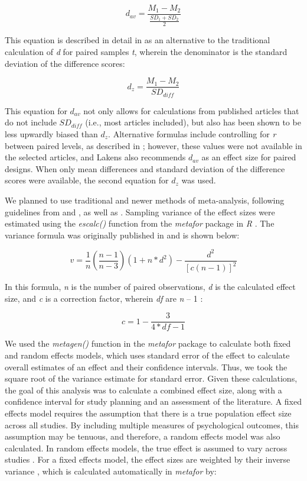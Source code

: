 \documentclass[english,man]{apa6}
\theoremstyle{definition}
\theoremstyle{definition}
\theoremstyle{definition}
\theoremstyle{remark}
\begin{document}
\[
{d_{av}} = \frac { M_1 - M_2 } { \frac { SD_1 + SD_2 } { 2 }}
\]

This equation is described in detail in \textcite{Cumming2012} as an
alternative to the traditional calculation of \emph{d} for paired
samples \emph{t}, wherein the denominator is the standard deviation of
the difference scores:

\[
{d_{z}} = \frac { M_1 - M_2 } { SD_{diff} }
\]

This equation for \(d_{av}\) not only allows for calculations from
published articles that do not include \(SD_{diff}\) (i.e., most
articles included), but also has been shown to be less upwardly biased
than \(d_{z}\). Alternative formulas include controlling for \emph{r}
between paired levels, as described in \textcite{Lakens2013}; however,
these values were not available in the selected articles, and Lakens
also recommends \(d_{av}\) as an effect size for paired designs. When
only mean differences and standard deviation of the difference scores
were available, the second equation for \(d_z\) was used.

We planned to use traditional and newer methods of meta-analysis,
following guidelines from \textcite{Cooper2009} and
\textcite{Borenstein2007}, as well as \textcite{VanAert2016}. Sampling
variance of the effect sizes were estimated using the \emph{escalc()}
function from the \emph{metafor} package in \emph{R}
\autocite{Viechtbauer2010}. The variance formula was originally
published in \textcite{Morris2002} and is shown below:

\[
v = \frac { 1 } { n } (\frac { n - 1 } { n - 3 } )(1 + n*d^2) - \frac { d^2 } { [c(n-1)]^2}
\]

In this formula, \emph{n} is the number of paired observations, \emph{d}
is the calculated effect size, and \emph{c} is a correction factor,
wherein \emph{df} are \emph{n} -- 1 \autocite{Hedges1982}:

\[
c = 1 - \frac { 3 } { 4*df - 1 }
\]

We used the \emph{metagen()} function in the \emph{metafor} package to
calculate both fixed and random effects models, which uses standard
error of the effect to calculate overall estimates of an effect and
their confidence intervals. Thus, we took the square root of the
variance estimate for standard error. Given these calculations, the goal
of this analysis was to calculate a combined effect size, along with a
confidence interval for study planning and an assessment of the
literature. A fixed effects model requires the assumption that there is
a true population effect size across all studies. By including multiple
measures of psychological outcomes, this assumption may be tenuous, and
therefore, a random effects model was also calculated. In random effects
models, the true effect is assumed to vary across studies
\autocite{Borenstein2007}. For a fixed effects model, the effect sizes
are weighted by their inverse variance
\autocite[\emph{v};][]{Sanchez-Meca2008a}, which is calculated
automatically in \emph{metafor} by:
\end{document}
